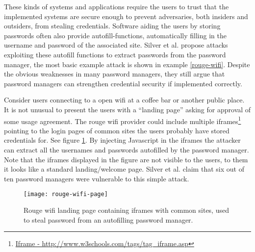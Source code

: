 These kinds of systems and applications require the users to trust that the implemented systems are secure enough to prevent adversaries, both insiders and outsiders, from stealing credentials. Software aiding the users by storing passwords often also provide autofill-functions, automatically filling in the username and password of the associated site. Silver et al. \cite{pw-managment-attacks} propose attacks exploiting these autofill functions to extract passwords from the password manager, the most basic example attack is shown in example \ref{rouge-wifi}. Despite the obvious weaknesses in many password managers, they still argue that password managers can strengthen credential security if implemented correctly.  
\begin{example}\label{rouge-wifi}
    Consider users connecting to a open wifi at a coffee bar or another public place. It is not unusual to present the users with a ``landing page'' asking for approval of some usage agreement. The rouge wifi provider could include multiple iframes\footnote{\url{Iframe - http://www.w3schools.com/tags/tag_iframe.asp}} pointing to the login pages of common sites the users probably have stored credentials for. See figure \ref{rouge-wifi-page}. By injecting Javascript in the iframes the attacker can extract all the usernames and passwords autofilled by the password manager. Note that the iframes displayed in the figure are not visible to the users, to them it looks like a standard landing/welcome page. Silver et al. \cite{pw-managment-attacks} claim that six out of ten password managers were vulnerable to this simple attack.


\begin{figure}
    \texttt{[image: rouge-wifi-page]}
    \caption{Rouge wifi landing page containing iframes with common sites, used to steal password from an autofilling password manager.} 
    \label{rouge-wifi-page}
\end{figure}

\end{example}

